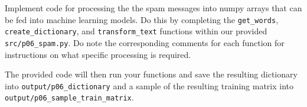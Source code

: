 \item {}
Implement code for processing the the spam messages into numpy arrays that can be fed into machine learning models. Do this by completing the \texttt{get\_words}, \texttt{create\_dictionary}, and \texttt{transform\_text} functions within our provided \texttt{src/p06\_spam.py}. Do note the corresponding comments for each function for instructions on what specific processing is required.

The provided code will then run your functions and save the resulting dictionary into \texttt{output/p06\_dictionary} and a sample of the resulting training matrix into \texttt{output/p06\_sample\_train\_matrix}.

\ifnum{} {
  
} \fi
